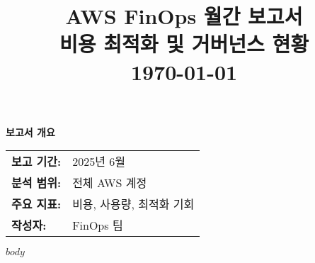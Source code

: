 \documentclass[11pt,a4paper]{article}
\title{
    \vspace{-2cm}
    \begin{center}
    {\Huge\color{finopsblue}\textbf{AWS FinOps 월간 보고서}}\\[1cm]
    {\Large\color{finopsgray}비용 최적화 및 거버넌스 현황}\\[0.3cm]
    {\large\color{finopsgray}\today}
    \end{center}
    \vspace{1cm}
}
\author{}
\date{}
\begin{document}
\maketitle
\thispagestyle{empty}

\vfill

\begin{center}
\begin{tcolorbox}[width=0.8\textwidth,colback=lightgray,colframe=finopsgray,arc=5pt]
\centering
\textbf{\Large 보고서 개요}\\[0.5cm]
\begin{tabular}{ll}
\textbf{보고 기간:} & 2025년 6월 \\
\textbf{분석 범위:} & 전체 AWS 계정 \\
\textbf{주요 지표:} & 비용, 사용량, 최적화 기회 \\
\textbf{작성자:} & FinOps 팀 \\
\end{tabular}
\end{tcolorbox}
\end{center}

\newpage

\tableofcontents
\newpage

$body$
\end{document}
